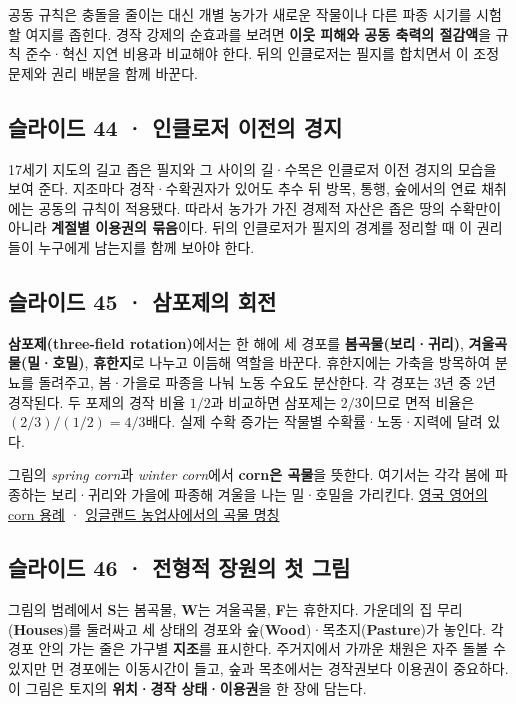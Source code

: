 \documentclass[10pt,a4paper]{article}
\begin{document}
공동 규칙은 충돌을 줄이는 대신 개별 농가가 새로운 작물이나 다른 파종 시기를 시험할 여지를 좁힌다. 경작 강제의 순효과를 보려면 \textbf{이웃 피해와 공동 축력의 절감액}을 규칙 준수·혁신 지연 비용과 비교해야 한다. 뒤의 인클로저는 필지를 합치면서 이 조정 문제와 권리 배분을 함께 바꾼다.\par

\subsection{슬라이드 44 · 인클로저 이전의 경지}
17세기 지도의 길고 좁은 필지와 그 사이의 길·수목은 인클로저 이전 경지의 모습을 보여 준다. 지조마다 경작·수확권자가 있어도 추수 뒤 방목, 통행, 숲에서의 연료 채취에는 공동의 규칙이 적용됐다. 따라서 농가가 가진 경제적 자산은 좁은 땅의 수확만이 아니라 \textbf{계절별 이용권의 묶음}이다. 뒤의 인클로저가 필지의 경계를 정리할 때 이 권리들이 누구에게 남는지를 함께 보아야 한다.\par

\subsection{슬라이드 45 · 삼포제의 회전}
\textbf{삼포제(three-field rotation)}에서는 한 해에 세 경포를 \textbf{봄곡물(보리·귀리)}, \textbf{겨울곡물(밀·호밀)}, \textbf{휴한지}로 나누고 이듬해 역할을 바꾼다. 휴한지에는 가축을 방목하여 분뇨를 돌려주고, 봄·가을로 파종을 나눠 노동 수요도 분산한다. 각 경포는 3년 중 2년 경작된다. 두 포제의 경작 비율 $1/2$과 비교하면 삼포제는 $2/3$이므로 면적 비율은 $(2/3)/(1/2)=4/3$배다. 실제 수확 증가는 작물별 수확률·노동·지력에 달려 있다.\par

그림의 \emph{spring corn}과 \emph{winter corn}에서 \textbf{corn은 곡물}을 뜻한다. 여기서는 각각 봄에 파종하는 보리·귀리와 가을에 파종해 겨울을 나는 밀·호밀을 가리킨다. \href{https://dictionary.cambridge.org/us/dictionary/english/corn}{영국 영어의 corn 용례} · \href{https://www.cambridge.org/core/books/experience-of-work-in-early-modern-england/agriculture-and-food-production/756B4A05E951DAD3663CEE82452005B5}{잉글랜드 농업사에서의 곡물 명칭}\par

\subsection{슬라이드 46 · 전형적 장원의 첫 그림}
그림의 범례에서 \textbf{S}는 봄곡물, \textbf{W}는 겨울곡물, \textbf{F}는 휴한지다. 가운데의 집 무리(\textbf{Houses})를 둘러싸고 세 상태의 경포와 숲(\textbf{Wood})·목초지(\textbf{Pasture})가 놓인다. 각 경포 안의 가는 줄은 가구별 \textbf{지조}를 표시한다. 주거지에서 가까운 채원은 자주 돌볼 수 있지만 먼 경포에는 이동시간이 들고, 숲과 목초에서는 경작권보다 이용권이 중요하다. 이 그림은 토지의 \textbf{위치·경작 상태·이용권}을 한 장에 담는다.\par
\end{document}
